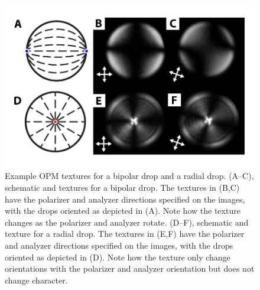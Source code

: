 \begin{figure}[h]
  \centering
  \includegraphics{figures/C2/Ch2-Figs_OPMDrops.png}
  \caption{Example OPM textures for a bipolar drop and a radial drop.
  (A--C), schematic and textures for a bipolar drop.
  The textures in (B,C) have the polarizer and analyzer directions specified on the images, with the drops oriented as depicted in (A).
  Note how the texture changes as the polarizer and analyzer rotate.
  (D--F), schematic and texture for a radial drop.
  The textures in (E,F) have the polarizer and analyzer directions specified on the images, with the drops oriented as depicted in (D).
  Note how the texture only change orientations with the polarizer and analyzer orientation but does not change character.}\label{f:2-OPMDrops}
\end{figure}

